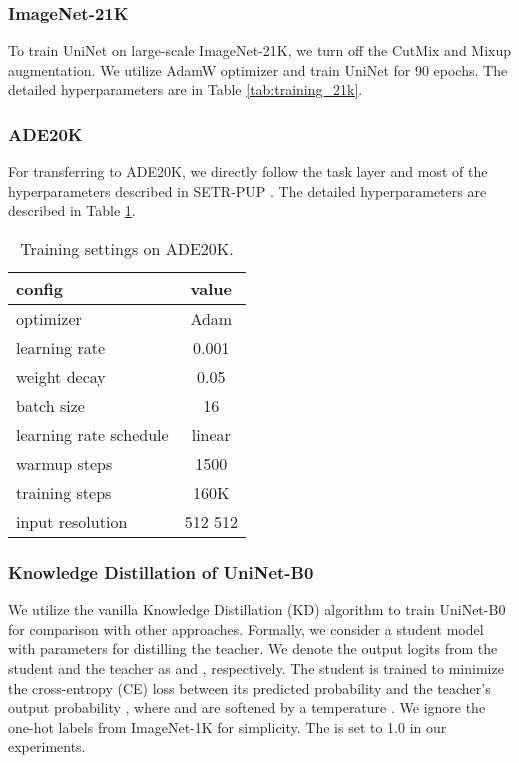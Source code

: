 \documentclass[runningheads]{llncs}
\begin{document}
\subsubsection{ImageNet-21K}
To train UniNet on large-scale ImageNet-21K, we turn off the CutMix and Mixup augmentation. We utilize AdamW optimizer and train UniNet for 90 epochs. The detailed hyperparameters are in Table \ref{tab:training_21k}.

\subsubsection{ADE20K}
For transferring to ADE20K, we directly follow the task layer and most of the hyperparameters described in SETR-PUP \cite{setr}. The detailed hyperparameters are described in Table \ref{tab:ade20k}.

\begin{table}[h]
    \centering
    \caption{Training settings on ADE20K.}
    \begin{tabular}{l|c}
        \toprule
        config & value \\
        \midrule
        optimizer & Adam \cite{adam} \\
        learning rate & 0.001 \\
        weight decay & 0.05 \\
        batch size & 16 \\
        learning rate schedule & linear \\
        warmup steps & 1500 \\
        training steps & 160K \\
        input resolution & 512  512 \\
        \bottomrule
    \end{tabular}
    \label{tab:ade20k}
\end{table}

\subsubsection{Knowledge Distillation of UniNet-B0}
We utilize the vanilla Knowledge Distillation (KD) algorithm to train UniNet-B0 for comparison with other approaches. Formally, we consider a student model  with parameters  for distilling the teacher. We denote the output logits from the student and the teacher as  and , respectively. The student is trained to minimize the cross-entropy (CE) loss between its predicted probability  and the teacher's output probability , where  and  are softened by a temperature . We ignore the one-hot labels from ImageNet-1K for simplicity. The  is set to 1.0 in our experiments.
\end{document}
